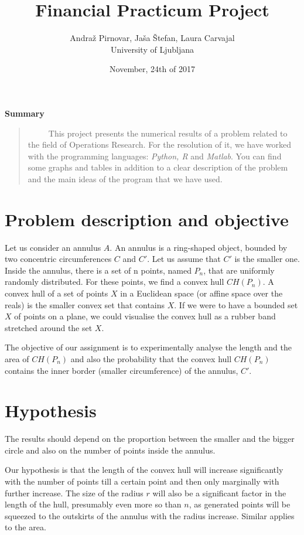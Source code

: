 \documentclass[12pt,a4paper]{article}
\begin{document}
\title{\bf Financial Practicum Project }
\author{Andraž Pirnovar, Jaša Štefan, Laura Carvajal  \\ University of Ljubljana}
\date{November, 24th of 2017}
\maketitle{}
\begin{center}
{\small{\bf Summary}}\end{center}
\begin{quote}
{\small 
\ \ \ \ \ This project presents the numerical results of a problem related to the field of Operations Research. For the resolution of it, we have worked with the programming languages: \textit{Python, R} and \textit{Matlab}. You can find some graphs and tables in addition to a clear description of the problem and the main ideas of the program that we have used.}
\end{quote}
\bigskip 
\section{Problem description and objective}
Let us consider an annulus $A$. An annulus is a ring-shaped object, bounded by two concentric circumferences $C$ and $C'$. Let us assume that $C'$ is the smaller one. Inside the annulus, there is a set of n points, named $P_n$, that are uniformly randomly distributed. For these points, we find a convex hull $CH(P_n)$. A convex hull of a set of points $X$ in a Euclidean space (or affine space over the reals) is the smaller convex set that contains $X$. If we were to have a bounded set $X$ of points on a plane, we could visualise the convex hull as a rubber band stretched around the set $X$. \medskip 
 
The objective of our assignment is to experimentally analyse the length and the area of $CH(P_n)$ and also the probability that the convex hull $CH(P_n)$ contains the inner border (smaller circumference) of the annulus, $C'$. 
\pagebreak 

\section{Hypothesis}
The results should depend on the proportion between the smaller and the bigger circle and also on the number of points inside the annulus.\medskip  
 
Our hypothesis is that the length of the convex hull will increase significantly with the number of points till a certain point and then only marginally with further increase. The size of the radius $r$ will also be a significant factor in the length of the hull, presumably even more so than $n$, as generated points will be squeezed to the outskirts of the annulus with the radius increase. Similar applies to the area.  \medskip 
 
\end{document}
